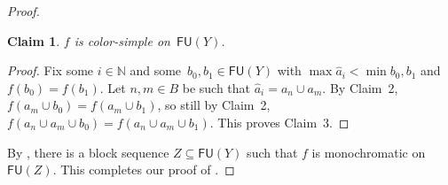 \documentclass[10pt,a4paper]{article}
\newcommand{\NN}[0]{\mathbb{N}}
\newcommand{\FU}[0]{\mathsf{FU}} %
\numberwithin{theorem}{section}
\newtheorem{claim}{Claim}
\begin{document}
\begin{proof}
\begin{claim}
$f$ is color-simple on~$\FU(Y)$.
\end{claim}
\begin{proof}
Fix some $i \in \NN$ and some~$b_0, b_1 \in \FU(Y)$ with $\max \hat a_i < \min b_0, b_1$ and $f(b_0) = f(b_1)$.
Let $n, m \in B$ be such that $\hat a_i = a_n \cup a_m$. By Claim~2, $f(a_m \cup b_0) = f(a_m \cup b_1)$, so still by Claim~2, $f(a_n \cup a_m \cup b_0) = f(a_n \cup a_m \cup b_1)$. This proves Claim~3.
\end{proof}

By , there is a block sequence $Z \subseteq \FU(Y)$ such that $f$ is monochromatic on~$\FU(Z)$. This completes our proof of .
\end{proof}




\end{document}
